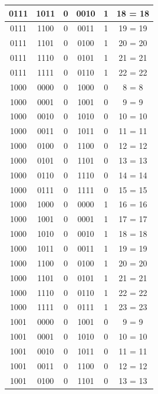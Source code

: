 \documentclass{exam}
\begin{document}
\begin{center}
\begin{longtable}{|c|c|c|c|c|c|}
                0111 & 1011 & 0 & 0010 & 1 & 18 = 18 \\ \hline
                0111 & 1100 & 0 & 0011 & 1 & 19 = 19 \\ \hline
                0111 & 1101 & 0 & 0100 & 1 & 20 = 20 \\ \hline
                0111 & 1110 & 0 & 0101 & 1 & 21 = 21 \\ \hline
                0111 & 1111 & 0 & 0110 & 1 & 22 = 22 \\ \hline
                1000 & 0000 & 0 & 1000 & 0 & 8 = 8 \\ \hline
                1000 & 0001 & 0 & 1001 & 0 & 9 = 9 \\ \hline
                1000 & 0010 & 0 & 1010 & 0 & 10 = 10 \\ \hline
                1000 & 0011 & 0 & 1011 & 0 & 11 = 11 \\ \hline
                1000 & 0100 & 0 & 1100 & 0 & 12 = 12 \\ \hline
                1000 & 0101 & 0 & 1101 & 0 & 13 = 13 \\ \hline
                1000 & 0110 & 0 & 1110 & 0 & 14 = 14 \\ \hline
                1000 & 0111 & 0 & 1111 & 0 & 15 = 15 \\ \hline
                1000 & 1000 & 0 & 0000 & 1 & 16 = 16 \\ \hline
                1000 & 1001 & 0 & 0001 & 1 & 17 = 17 \\ \hline
                1000 & 1010 & 0 & 0010 & 1 & 18 = 18 \\ \hline
                1000 & 1011 & 0 & 0011 & 1 & 19 = 19 \\ \hline
                1000 & 1100 & 0 & 0100 & 1 & 20 = 20 \\ \hline
                1000 & 1101 & 0 & 0101 & 1 & 21 = 21 \\ \hline
                1000 & 1110 & 0 & 0110 & 1 & 22 = 22 \\ \hline
                1000 & 1111 & 0 & 0111 & 1 & 23 = 23 \\ \hline
                1001 & 0000 & 0 & 1001 & 0 & 9 = 9 \\ \hline
                1001 & 0001 & 0 & 1010 & 0 & 10 = 10 \\ \hline
                1001 & 0010 & 0 & 1011 & 0 & 11 = 11 \\ \hline
                1001 & 0011 & 0 & 1100 & 0 & 12 = 12 \\ \hline
                1001 & 0100 & 0 & 1101 & 0 & 13 = 13 \\ \hline

\end{longtable}
\end{center}
\end{document}
